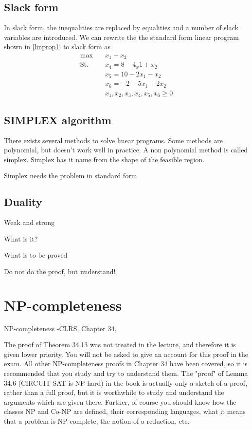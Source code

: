 \documentclass[10pt]{article}
\begin{document}
\subsection{Slack form} %
\label{sub:slack_form}
In slack form, the inequalities are replaced by equalities and a number of slack variables are introduced. We can rewrite the the standard form linear program shown in \ref{linprop1} to slack form as
\begin{align*}
 \max &\quad x_1 + x_2  \\ 
 \text{St.} &\quad  x_4 = 8 - 4_x1 + x_2 \\
            &\quad  x_5 = 10 -2x_1 - x_2\\
            &\quad  x_6 = -2 -5x_1 + 2x_2 \\            
            &\quad  x_1,x_2,x_3,x_4,x_5,x_6 \geq 0 
\end{align*}

\subsection{SIMPLEX algorithm} %
\label{sub:simplex_algorithm}
There exists several methods to solve linear programs. Some methods are polynomial, but doesn't work well in practice. A non polynomial method is called simplex. Simplex has it name from the shape of the feasible region.

Simplex needs the problem in standard form

\subsection{Duality} %
\label{sub:duality}
Weak and strong

What is it?

What is to be proved

Do not do the proof, but understand!




\section{NP-completeness} %
\label{sec:np_completeness}
NP-completeness -CLRS, Chapter 34,   


The proof of  Theorem 34.13 was not treated in the lecture, and therefore it is given lower priority. You will not be asked to give an account for this proof in the exam. All other NP-completeness proofs in Chapter 34 have been covered, so it is recommended that you study and try to understand them. The "proof" of Lemma 34.6 (CIRCUIT-SAT is NP-hard) in the book is actually only a sketch of a proof, rather than a full proof, but it is worthwhile to study and understand the arguments which are given there. Further, of course you should know how the classes NP and Co-NP are defined, their corresponding languages, what it means that a problem is NP-complete, the notion of a reduction, etc.
\end{document}
